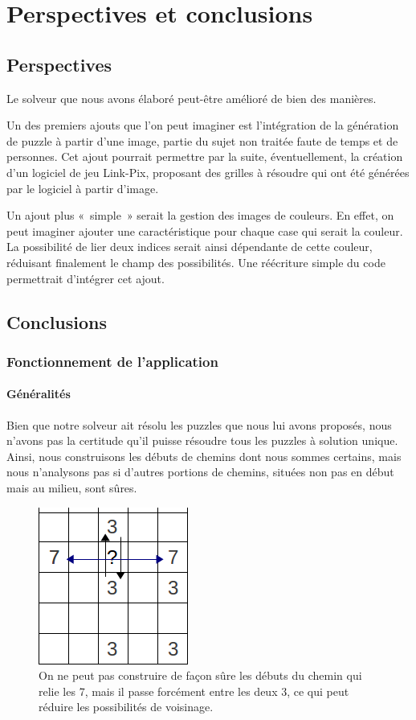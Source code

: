 \chapter{Perspectives et conclusions} 
  \section{Perspectives} 
 
Le solveur que nous avons élaboré peut-être amélioré de bien des manières.

Un des premiers ajouts que l'on peut imaginer est l'intégration de la génération de puzzle à partir d'une image, partie du sujet non traitée faute de temps et de personnes. Cet ajout pourrait permettre par la suite, éventuellement, la création d'un logiciel de jeu Link-Pix, proposant des grilles à résoudre qui ont été générées par le logiciel à partir d'image.

Un ajout plus «~simple~» serait la gestion des images de couleurs. En effet, on peut imaginer ajouter une caractéristique pour chaque case qui serait la couleur. La possibilité de lier deux indices serait ainsi dépendante de cette couleur, réduisant finalement le champ des possibilités. Une réécriture simple du code permettrait d'intégrer cet ajout.
 
  \section{Conclusions} 
   \subsection{Fonctionnement de l’application} 

   \subsubsection{Généralités}

Bien que notre solveur ait résolu les puzzles que nous lui avons proposés, nous n'avons pas la certitude qu'il puisse résoudre tous les puzzles à solution unique. Ainsi, nous construisons les débuts de chemins dont nous sommes certains, mais nous n'analysons pas si d'autres portions de chemins, situées non pas en début mais au milieu, sont sûres.

\begin{figure}[h!]
      \centering
      \includegraphics[scale=0.5]{solvable1}
      \caption{On ne peut pas construire de façon sûre les débuts du chemin qui relie les 7, mais il passe forcément entre les deux 3, ce qui peut réduire les possibilités de voisinage.}
\end{figure}

